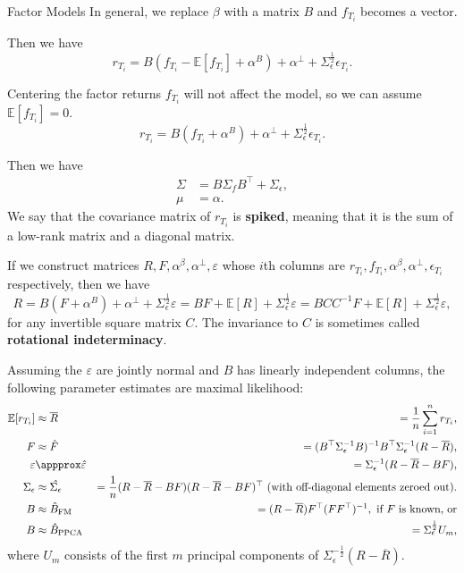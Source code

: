 \documentclass{beamer}
\begin{document}
\begin{frame}{Factor Models}
	In general, we replace $\beta$ with a matrix $B$ and $f_{T_i}$ becomes a vector.

	Then we have
	$$r_{T_i} = B(f_{T_i}-\mathbb{E}[f_{T_i}] + \alpha^B) + \alpha^\bot + \Sigma_\epsilon^\frac{1}{2}\epsilon_{T_i}.$$

	Centering the factor returns $f_{T_i}$ will not affect the model, so we can assume $\mathbb{E}[f_{T_i}]=0$.
	$$r_{T_i} = B(f_{T_i} + \alpha^B) + \alpha^\bot + \Sigma_\epsilon^\frac{1}{2}\epsilon_{T_i}.$$

	Then we have
	\begin{align*}
		\Sigma	&= B \Sigma_f B^\top + \Sigma_\epsilon,
	\\	\mu	&= \alpha.
	\end{align*}
	We say that the covariance matrix of $r_{T_i}$ is \textbf{spiked}, meaning that it is the sum of a low-rank matrix and a diagonal matrix.

	If we construct matrices $R,F,\alpha^\beta,\alpha^\bot,\varepsilon$ whose $i$th columns are $r_{T_i},f_{T_i},\alpha^\beta,\alpha^\bot,\epsilon_{T_i}$ respectively, then we have
	$$R = B(F + \alpha^B) + \alpha^\bot + \Sigma_\epsilon^\frac{1}{2}\varepsilon = BF + \mathbb{E}[R] + \Sigma_\epsilon^\frac{1}{2}\varepsilon = BCC^{-1}F + \mathbb{E}[R] + \Sigma_\epsilon^\frac{1}{2}\varepsilon,$$
	for any invertible square matrix $C$. The invariance to $C$ is sometimes called \textbf{rotational indeterminacy}.

	Assuming the $\varepsilon$ are jointly normal and $B$ has linearly independent columns, the following parameter estimates are maximal likelihood:
	\begin{align*}
		\mathbb{E}[r_{T_i}]	&\approx \overline{R}		&= \frac{1}{n}\sum_{i=1}^n r_{T_i},
	\\	F			&\approx \hat{F}		&= (B^\top \Sigma_\epsilon^{-1} B)^{-1}B^\top \Sigma_\epsilon^{-1}(R-\overline{R}),
	\\	\varepsilon		&\appprox \hat{\varepsilon}	&= \Sigma_\epsilon^{-1} (R-\overline{R}-BF),
	\\	\Sigma_\epsilon		&\approx \hat{\Sigma_\epsilon}	&= \frac{1}{n}(R-\overline{R}-BF)(R-\overline{R}-BF)^\top \textrm{ (with off-diagonal elements zeroed out)}.
	\\	B			&\approx \hat{B}_\textrm{FM}	&= (R-\overline{R})F^\top (FF^\top)^{-1},\textrm{ if }F\textrm{ is known, or}%
	\\	B			&\approx \hat{B}_\textrm{PPCA}	&= \Sigma_\epsilon^\frac{1}{2} U_m,%
	\end{align*}
	where $U_m$ consists of the first $m$ principal components of $\Sigma_\epsilon^{-\frac{1}{2}}(R-\overline{R})$.%


\end{frame}
\end{document}
